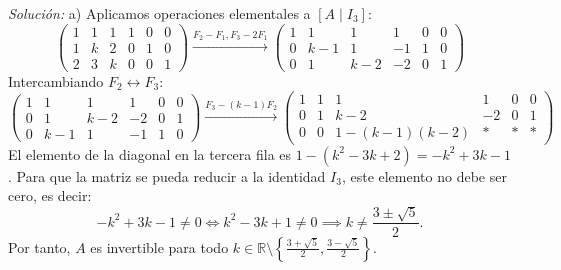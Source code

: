 \documentclass[11pt,letterpaper]{article}
\theoremstyle{definition}
\theoremstyle{plain}
\newcommand{\R}{\mathbb{R}}
\begin{document}
\emph{Solución:}
a) Aplicamos operaciones elementales a $[A \mid I_3]$:
\[
\left(\begin{array}{ccc|ccc}
1 & 1 & 1 & 1 & 0 & 0 \\
1 & k & 2 & 0 & 1 & 0 \\
2 & 3 & k & 0 & 0 & 1
\end{array}\right) \xrightarrow{F_2-F_1, F_3-2F_1}
\left(\begin{array}{ccc|ccc}
1 & 1 & 1 & 1 & 0 & 0 \\
0 & k-1 & 1 & -1 & 1 & 0 \\
0 & 1 & k-2 & -2 & 0 & 1
\end{array}\right)
\]
Intercambiando $F_2 \leftrightarrow F_3$:
\[
\left(\begin{array}{ccc|ccc}
1 & 1 & 1 & 1 & 0 & 0 \\
0 & 1 & k-2 & -2 & 0 & 1 \\
0 & k-1 & 1 & -1 & 1 & 0
\end{array}\right) \xrightarrow{F_3 - (k-1)F_2}
\left(\begin{array}{ccc|ccc}
1 & 1 & 1 & 1 & 0 & 0 \\
0 & 1 & k-2 & -2 & 0 & 1 \\
0 & 0 & 1 - (k-1)(k-2) & \ast & \ast & \ast
\end{array}\right)
\]
El elemento de la diagonal en la tercera fila es $1 - (k^2 - 3k + 2) = -k^2 + 3k - 1$.
Para que la matriz se pueda reducir a la identidad $I_3$, este elemento no debe ser cero, es decir:
\[
-k^2 + 3k - 1 \neq 0 \iff k^2 - 3k + 1 \neq 0 \implies k \neq \frac{3 \pm \sqrt{5}}{2}.
\]
Por tanto, $A$ es invertible para todo $k \in \R \setminus \left\{ \frac{3 + \sqrt{5}}{2}, \frac{3 - \sqrt{5}}{2} \right\}$.
\end{document}
